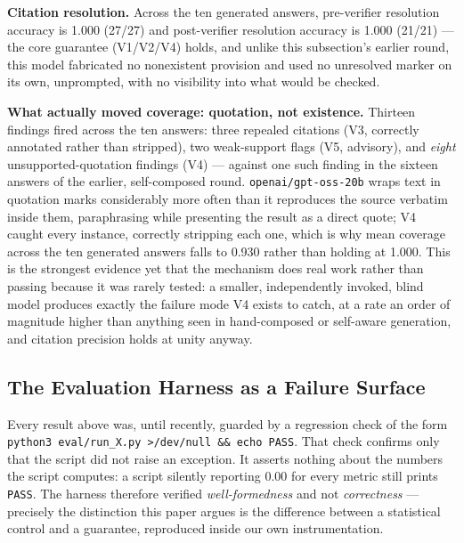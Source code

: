 \documentclass[conference]{IEEEtran}
\begin{document}
\textbf{Citation resolution.} Across the ten generated answers, pre-verifier
resolution accuracy is 1.000 (27/27) and post-verifier resolution accuracy is
1.000 (21/21) --- the core guarantee (V1/V2/V4) holds, and unlike this
subsection's earlier round, this model fabricated no nonexistent provision
and used no unresolved marker on its own, unprompted, with no visibility
into what would be checked.

\textbf{What actually moved coverage: quotation, not existence.} Thirteen
findings fired across the ten answers: three repealed citations (V3,
correctly annotated rather than stripped), two weak-support flags (V5,
advisory), and \emph{eight} unsupported-quotation findings (V4) --- against
one such finding in the sixteen answers of the earlier, self-composed round.
\texttt{openai/gpt-oss-20b} wraps text in quotation marks considerably more
often than it reproduces the source verbatim inside them, paraphrasing while
presenting the result as a direct quote; V4 caught every instance,
correctly stripping each one, which is why mean coverage across the ten
generated answers falls to 0.930 rather than holding at 1.000. This is the
strongest evidence yet that the mechanism does real work rather than passing
because it was rarely tested: a smaller, independently invoked, blind model
produces exactly the failure mode V4 exists to catch, at a rate an order of
magnitude higher than anything seen in hand-composed or self-aware
generation, and citation precision holds at unity anyway.

\subsection{The Evaluation Harness as a Failure Surface}
\label{ssec:harness}

Every result above was, until recently, guarded by a regression check of the
form \texttt{python3 eval/run\_X.py >/dev/null \&\& echo PASS}. That check
confirms only that the script did not raise an exception. It asserts nothing
about the numbers the script computes: a script silently reporting 0.00 for
every metric still prints \texttt{PASS}. The harness therefore verified
\emph{well-formedness} and not \emph{correctness} --- precisely the distinction
this paper argues is the difference between a statistical control and a
guarantee, reproduced inside our own instrumentation.
\end{document}
